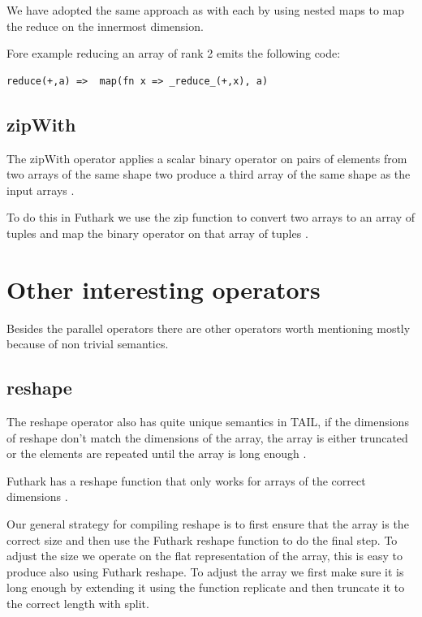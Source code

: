 \documentclass[11pt]{article}
\begin{document}
We have adopted the same approach as with each by using nested maps to map the reduce on the innermost dimension.

Fore example reducing an array of rank 2 emits the following code:

\begin{lstlisting}[numbers=none,frame=none]
reduce(+,a)	=> 	map(fn x => _reduce_(+,x), a)
\end{lstlisting}

\subsection{zipWith}

The zipWith operator applies a scalar binary operator on pairs of elements from two arrays of the same shape two
produce a third array of the same shape as the input arrays \cite{ElsmanDybdal:Array:2014}.

To do this in Futhark we use the zip function to convert two arrays to an array of tuples and map the binary operator on that array of tuples \cite{TroelsHenriksen}.

\section{Other interesting operators}

Besides the parallel operators there are other operators worth mentioning mostly because of non trivial semantics.  

\subsection{reshape}

The reshape operator also has quite unique semantics in TAIL, if the dimensions of reshape don't match the dimensions of the array, the
array is either truncated or the elements are repeated until the array is long enough \cite{ElsmanDybdal:Array:2014}.

Futhark has a reshape function that only works for arrays of the correct dimensions \cite{TroelsHenriksen}.

Our general strategy for compiling reshape is to first ensure that the array is the correct size and then use the Futhark reshape
function to do the final step. To adjust the size we operate on the flat representation of the array, this is easy to produce also
using Futhark reshape. To adjust the array we first make sure it is long enough by extending it using the function replicate and then
truncate it to the correct length with split.
\end{document}
